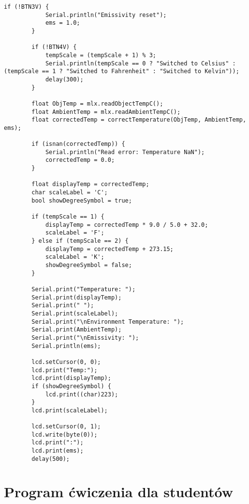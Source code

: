 \begin{lstlisting}[style=mystyle]
        if (!BTN3V) {
            Serial.println("Emissivity reset");
            ems = 1.0;
        }
    
        if (!BTN4V) {
            tempScale = (tempScale + 1) % 3;
            Serial.println(tempScale == 0 ? "Switched to Celsius" : (tempScale == 1 ? "Switched to Fahrenheit" : "Switched to Kelvin"));
            delay(300);
        }
    
        float ObjTemp = mlx.readObjectTempC();
        float AmbientTemp = mlx.readAmbientTempC();
        float correctedTemp = correctTemperature(ObjTemp, AmbientTemp, ems);
    
        if (isnan(correctedTemp)) {
            Serial.println("Read error: Temperature NaN");
            correctedTemp = 0.0;
        }
    
        float displayTemp = correctedTemp;
        char scaleLabel = 'C';
        bool showDegreeSymbol = true;
    
        if (tempScale == 1) {
            displayTemp = correctedTemp * 9.0 / 5.0 + 32.0;
            scaleLabel = 'F';
        } else if (tempScale == 2) {
            displayTemp = correctedTemp + 273.15;
            scaleLabel = 'K';
            showDegreeSymbol = false;
        }
    
        Serial.print("Temperature: ");
        Serial.print(displayTemp);
        Serial.print(" ");
        Serial.print(scaleLabel);
        Serial.print("\nEnvironment Temperature: ");
        Serial.print(AmbientTemp);
        Serial.print("\nEmissivity: ");
        Serial.println(ems);
    
        lcd.setCursor(0, 0);
        lcd.print("Temp:");
        lcd.print(displayTemp);
        if (showDegreeSymbol) {
            lcd.print((char)223);
        }
        lcd.print(scaleLabel);
    
        lcd.setCursor(0, 1);
        lcd.write(byte(0));
        lcd.print(":");
        lcd.print(ems);
        delay(500);
    \end{lstlisting}

    \chapter*{Program ćwiczenia dla studentów}